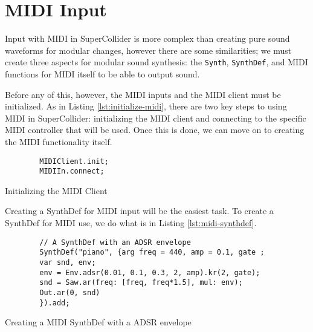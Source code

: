 \section{MIDI Input}\label{section:midi-input}

Input with MIDI in SuperCollider is more complex than creating pure sound waveforms for modular changes, however there are some similarities; we must create three aspects for modular sound synthesis: the \texttt{Synth}, \texttt{SynthDef}, and MIDI functions for MIDI itself to be able to output sound. 

Before any of this, however, the MIDI inputs and the MIDI client must be initialized. As in Listing \ref{lst:initialize-midi}, there are two key steps to using MIDI in SuperCollider: initializing the MIDI client and connecting to the specific MIDI controller that will be used. Once this is done, we can move on to creating the MIDI functionality itself.

\begin{listing}
	\begin{lstlisting}
		MIDIClient.init;
		MIDIIn.connect;
	\end{lstlisting}
	\caption{Initializing the MIDI Client}
	\label{lst:initialize-midi}
\end{listing}

Creating a SynthDef for MIDI input will be the easiest task. To create a SynthDef for MIDI use, we do what is in Listing \ref{lst:midi-synthdef}. 

\begin{listing}
	\begin{lstlisting}
		// A SynthDef with an ADSR envelope
		SynthDef("piano", {arg freq = 440, amp = 0.1, gate ;
		var snd, env;
		env = Env.adsr(0.01, 0.1, 0.3, 2, amp).kr(2, gate);
		snd = Saw.ar(freq: [freq, freq*1.5], mul: env);
		Out.ar(0, snd)
		}).add;
	\end{lstlisting}
	\caption{Creating a MIDI SynthDef with a ADSR envelope}
	\label{lst:midi-synthdef}	
\end{listing}

